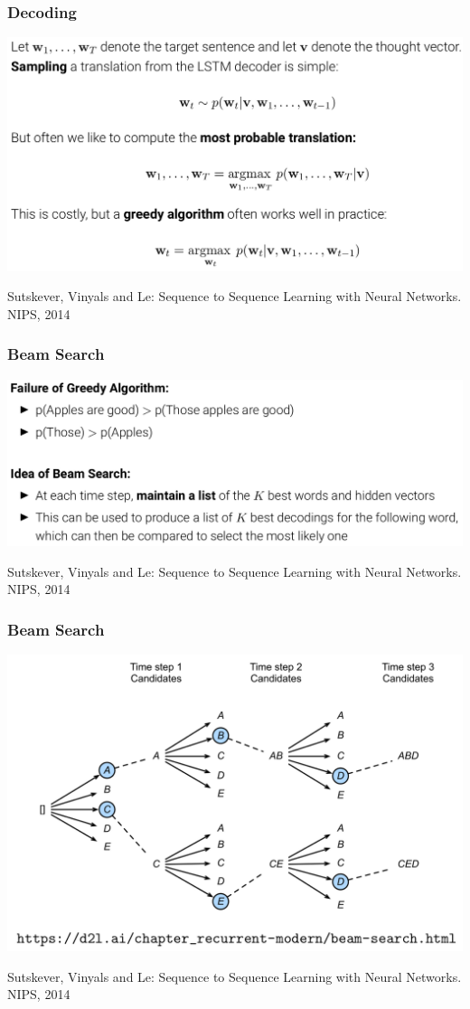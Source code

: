 \documentclass[10pt]{beamer}
\begin{document}
\begin{frame}
  \frametitle{Decoding}
\begin{center}
\includegraphics[width=.85\textwidth]{images/sb}
\end{center}
\scriptsize{Sutskever, Vinyals and Le: Sequence to Sequence Learning with Neural Networks. NIPS, 2014}
\end{frame}


\begin{frame}
  \frametitle{Beam Search}
\begin{center}
\includegraphics[width=.95\textwidth]{images/sc}
\end{center}
\scriptsize{Sutskever, Vinyals and Le: Sequence to Sequence Learning with Neural Networks. NIPS, 2014}
\end{frame}

\begin{frame}
  \frametitle{Beam Search}
\begin{center}
\includegraphics[width=.7\textwidth]{images/sd}
\end{center}
\scriptsize{Sutskever, Vinyals and Le: Sequence to Sequence Learning with Neural Networks. NIPS, 2014}
\end{frame}
\end{document}
